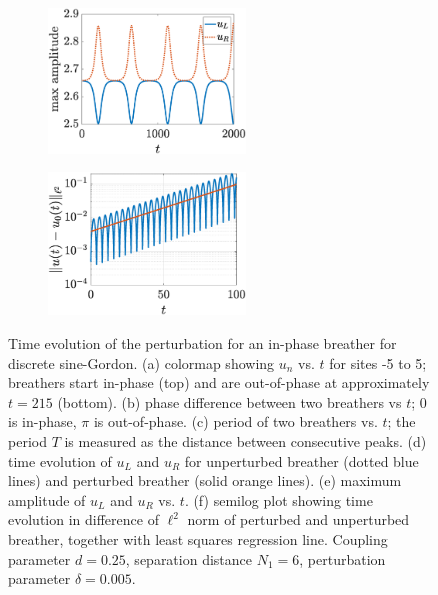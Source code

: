 \documentclass[12pt,reqno]{amsart}
\theoremstyle{definition}
\begin{document}
\begin{figure}
\begin{center}
\begin{subfigure}{0.3\linewidth}
		\label{fig:timestepSGunstabled}
	\end{subfigure}
		\begin{subfigure}{0.3\linewidth}
		\caption{}
		\includegraphics[width=5.25cm]{timestepN6ppmaxamp.eps} \hspace{-0.5cm}
		\label{fig:timestepSGunstablee}
	\end{subfigure}
	\begin{subfigure}{0.3\linewidth}
		\caption{}
		\includegraphics[width=5.25cm]{timestepN6ppgrowth.eps} \hspace{-0.5cm}
		\label{fig:timestepSGunstablef}
	\end{subfigure}
	\end{center}
	\caption{Time evolution of the perturbation for an in-phase breather for discrete sine-Gordon. (a) colormap showing $u_n$ vs. $t$ for sites -5 to 5; breathers start in-phase (top) and are out-of-phase at approximately $t = 215$ (bottom). (b) phase difference between two breathers vs $t$; 0 is in-phase, $\pi$ is out-of-phase. (c) period of two breathers vs. $t$; the period $T$ is measured as the distance between consecutive peaks. (d) time evolution of $u_L$ and $u_R$ for unperturbed breather (dotted blue lines) and perturbed breather (solid orange lines). (e) maximum amplitude of $u_L$ and $u_R$ vs. $t$. (f) semilog plot showing time evolution in difference of $\ell^2$ norm of perturbed and unperturbed breather, together with least squares regression line. Coupling parameter $d=0.25$, separation distance $N_1 = 6$, perturbation parameter $\delta = 0.005$.}
	\label{fig:timestepSGunstable}
\end{figure}
\end{document}
